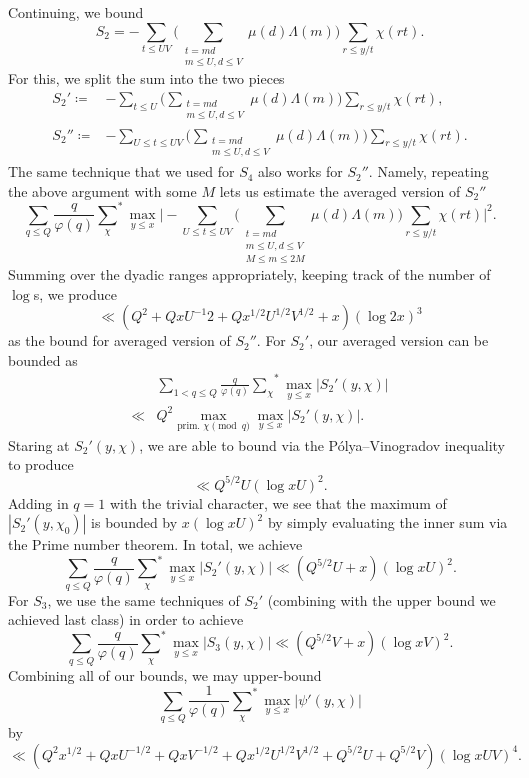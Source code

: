 \documentclass[../notes.tex]{subfiles}
\begin{document}
Continuing, we bound
\[S_2 = -\sum_{t\le UV}\Bigg(\sum_{\substack{t=md\\m\le U,d\le V}}\mu(d)\Lambda(m)\Bigg)\sum_{r\le y/t}\chi(rt).\]
For this, we split the sum into the two pieces
\begin{align*}
	S_2' \coloneqq{}& -\sum_{t\le U}\Bigg(\sum_{\substack{t=md\\m\le U,d\le V}}\mu(d)\Lambda(m)\Bigg)\sum_{r\le y/t}\chi(rt), \\
	S_2'' \coloneqq{}& -\sum_{U\le t\le UV}\Bigg(\sum_{\substack{t=md\\m\le U,d\le V}}\mu(d)\Lambda(m)\Bigg)\sum_{r\le y/t}\chi(rt).
\end{align*}
The same technique that we used for $S_4$ also works for $S_2''$. Namely, repeating the above argument with some $M$ lets us estimate the averaged version of $S_2''$
\[\sum_{q\le Q}\frac q{\varphi(q)}{\sum_\chi}^*\max_{y\le x}\Bigg|-\sum_{U\le t\le UV}\Bigg(\sum_{\substack{t=md\\m\le U,d\le V\\M\le m\le2M}}\mu(d)\Lambda(m)\Bigg)\sum_{r\le y/t}\chi(rt)\Bigg|^2.\]
Summing over the dyadic ranges appropriately, keeping track of the number of $\log$s, we produce
\[\ll\left(Q^2+QxU^{-1}2+Qx^{1/2}U^{1/2}V^{1/2}+x\right)(\log2x)^3\]
as the bound for averaged version of $S_2''$. For $S_2'$, our averaged version can be bounded as
\begin{align*}
	&\sum_{1<q\le Q}\frac q{\varphi(q)}{\sum_\chi}^*\max_{y\le x}|S_2'(y,\chi)| \\
	\ll{}& Q^2\max_{\text{prim. }\chi\pmod q}\max_{y\le x}|S_2'(y,\chi)|.
\end{align*}
Staring at $S_2'(y,\chi)$, we are able to bound via the P\'olya--Vinogradov inequality to produce
\[\ll Q^{5/2}U(\log xU)^2.\]
Adding in $q=1$ with the trivial character, we see that the maximum of $|S_2'(y,\chi_0)|$ is bounded by $x(\log xU)^2$ by simply evaluating the inner sum via the Prime number theorem. In total, we achieve
\[\sum_{q\le Q}\frac q{\varphi(q)}{\sum_\chi}^*\max_{y\le x}|S_2'(y,\chi)|\ll\left(Q^{5/2}U+x\right)(\log xU)^2.\]
For $S_3$, we use the same techniques of $S_2'$ (combining with the upper bound we achieved last class) in order to achieve
\[\sum_{q\le Q}\frac q{\varphi(q)}{\sum_\chi}^*\max_{y\le x}\left|S_3(y,\chi)\right|\ll\left(Q^{5/2}V+x\right)(\log xV)^2.\]
Combining all of our bounds, we may upper-bound
\[\sum_{q\le Q}\frac1{\varphi(q)}{\sum_\chi}^*\max_{y\le x}|\psi'(y,\chi)|\]
by
\[\ll\left(Q^2x^{1/2}+QxU^{-1/2}+QxV^{-1/2}+Qx^{1/2}U^{1/2}V^{1/2}+Q^{5/2}U+Q^{5/2}V\right)(\log xUV)^4.\]
\end{document}
